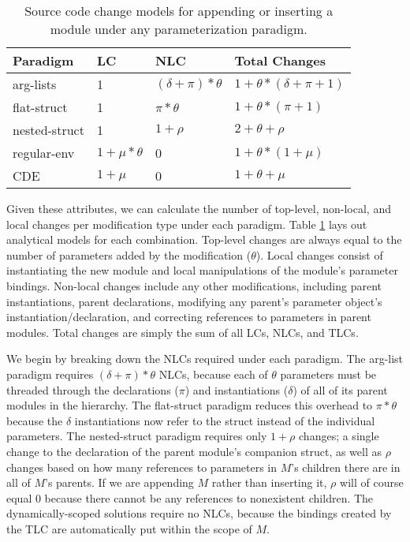 \begin{table}
\centering
\begin{tabular}{llll}
\toprule
Paradigm    & LC & NLC & Total Changes\\
\midrule
arg-lists      &  1              & $(\delta+\pi)*\theta$ & $1+\theta*(\delta+\pi+1)$  \\
flat-struct    &  1              & $\pi*\theta$          & $1+\theta*(\pi+1)$  \\
nested-struct  &  1              & $1+\rho$              & $2+\theta+\rho$  \\
regular-env    &  $1+\mu*\theta$ & 0                     & $1+\theta*(1+\mu)$ \\
CDE            &  $1+\mu$        & 0                     & $1+\theta+\mu$  \\
\bottomrule
\end{tabular}
\caption{Source code change models for appending or inserting a module under any parameterization paradigm.}
\label{tab:limit}
\end{table}

Given these attributes, we can calculate the number of top-level, non-local, and local changes per modification type under each paradigm.
Table \ref{tab:limit} lays out analytical models for each combination.
Top-level changes are always equal to the number of parameters added by the modification ($\theta$).
Local changes consist of instantiating the new module and local manipulations of the module's parameter bindings.
Non-local changes include any other modifications, including parent instantiations, parent declarations, modifying any parent's parameter object's instantiation/declaration,
and correcting references to parameters in parent modules.
Total changes are simply the sum of all LCs, NLCs, and TLCs.

We begin by breaking down the NLCs required under each paradigm.
The arg-list paradigm requires $(\delta+\pi)*\theta$ NLCs, because each of $\theta$ parameters must be threaded through the declarations ($\pi$) and instantiations ($\delta$) of all of its parent modules in the hierarchy.
The flat-struct paradigm reduces this overhead to $\pi*\theta$ because the $\delta$ instantiations now refer to the struct instead of the individual parameters.
The nested-struct paradigm requires only $1+\rho$ changes; a single change to the declaration of the parent module's companion struct, as well as $\rho$ changes based on how many
references to parameters in $M$'s children there are in all of $M$'s parents.
If we are appending $M$ rather than inserting it, $\rho$ will of course equal 0 because there cannot be any references to nonexistent children.
The dynamically-scoped solutions require no NLCs, because the bindings created by the TLC are automatically put within the scope of $M$.

